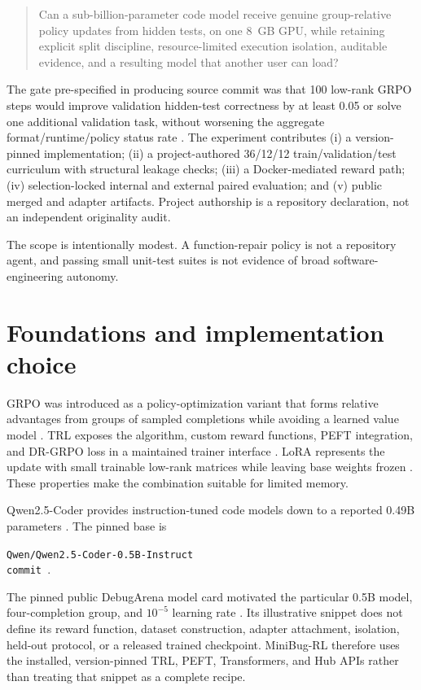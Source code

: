 \documentclass[11pt]{article}
\begin{document}
\begin{quote}
Can a sub-billion-parameter code model receive genuine group-relative policy updates from hidden tests, on one 8~GB GPU, while retaining explicit split discipline, resource-limited execution isolation, auditable evidence, and a resulting model that another user can load?
\end{quote}

The gate pre-specified in producing source commit \texttt{\SourceCommit} was that 100 low-rank GRPO steps would improve validation hidden-test correctness by at least 0.05 or solve one additional validation task, without worsening the aggregate format/runtime/policy status rate \cite{sourcecommit}. The experiment contributes (i) a version-pinned implementation; (ii) a project-authored 36/12/12 train/validation/test curriculum with structural leakage checks; (iii) a Docker-mediated reward path; (iv) selection-locked internal and external paired evaluation; and (v) public merged and adapter artifacts. Project authorship is a repository declaration, not an independent originality audit.

The scope is intentionally modest. A function-repair policy is not a repository agent, and passing small unit-test suites is not evidence of broad software-engineering autonomy.

\section{Foundations and implementation choice}

GRPO was introduced as a policy-optimization variant that forms relative advantages from groups of sampled completions while avoiding a learned value model \cite{deepseekmath}. TRL exposes the algorithm, custom reward functions, PEFT integration, and DR-GRPO loss in a maintained trainer interface \cite{trl}. LoRA represents the update with small trainable low-rank matrices while leaving base weights frozen \cite{lora,peft}. These properties make the combination suitable for limited memory.

Qwen2.5-Coder provides instruction-tuned code models down to a reported 0.49B parameters \cite{qwen,qwenmodel}. The pinned base is
\begin{center}
\small\texttt{Qwen/Qwen2.5-Coder-0.5B-Instruct}\\
\texttt{commit \BaseRevision}.
\end{center}
The pinned public DebugArena model card motivated the particular 0.5B model, four-completion group, and $10^{-5}$ learning rate \cite{debugarena}. Its illustrative snippet does not define its reward function, dataset construction, adapter attachment, isolation, held-out protocol, or a released trained checkpoint. MiniBug-RL therefore uses the installed, version-pinned TRL, PEFT, Transformers, and Hub APIs rather than treating that snippet as a complete recipe.
\end{document}

